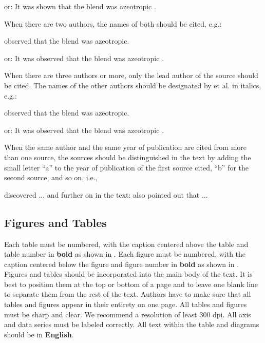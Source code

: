 or:	It was shown that the blend was azeotropic \citep{Janna1986}.

When there are two authors, the names of both should be cited, e.g.:

	\citet{Herbe1997} observed that the blend was azeotropic.
 
or:	It was observed that the blend was azeotropic \citep{Herbe1997}.

When there are three authors or more, only the lead author of the source should be cited. The names of the other authors should be designated by et al. in italics, e.g.:

	\citet{Hofmann2021} observed that the blend was azeotropic.
 
or:	It was observed that the blend was azeotropic \citep{Hofmann2021}.

When the same author and the same year of publication are cited from more than one source, the sources should be distinguished in the text by adding the small letter ``a'' to the year of publication of the first source cited, ``b'' for the second source, and so on, i.e.,
	
\citet{Tsatsaronis1985a} discovered ... and further on in the text:	\citet{Tsatsaronis1985b} also pointed out  that ...

\subsection{Figures and Tables}
Each table must be numbered, with the caption centered above the table and table number in \textbf{bold} as shown in . Each figure must be numbered, with the caption centered below the figure and figure number in \textbf{bold} as shown in . Figures and tables should be incorporated into the main body of the text. It is best to position them at the top or bottom of a page and to leave one blank line to separate them from the rest of the text. Authors have to make sure that all tables and figures appear in their entirety on one page. All tables and figures must be sharp and clear. We recommend a resolution of least 300 dpi. All axis and data series must be labeled correctly. All text within the table and diagrams should be in \textbf{English}. 


